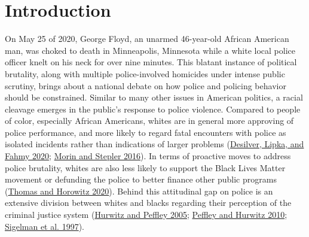 \documentclass[
  12pt,
]{article}
\begin{document}

\ifdefined\Shaded\renewenvironment{Shaded}{\begin{tcolorbox}[sharp corners, breakable, enhanced, interior hidden, boxrule=0pt, borderline west={3pt}{0pt}{shadecolor}, frame hidden]}{\end{tcolorbox}}\fi

\hypertarget{introduction}{%
\section{Introduction}\label{introduction}}

On May 25 of 2020, George Floyd, an unarmed 46-year-old African American
man, was choked to death in Minneapolis, Minnesota while a white local
police officer knelt on his neck for over nine minutes. This blatant
instance of political brutality, along with multiple police-involved
homicides under intense public scrutiny, brings about a national debate
on how police and policing behavior should be constrained. Similar to
many other issues in American politics, a racial cleavage emerges in the
public's response to police violence. Compared to people of color,
especially African Americans, whites are in general more approving of
police performance, and more likely to regard fatal encounters with
police as isolated incidents rather than indications of larger problems
(\protect\hyperlink{ref-desilver}{Desilver, Lipka, and Fahmy 2020};
\protect\hyperlink{ref-morin2016}{Morin and Stepler 2016}). In terms of
proactive moves to address police brutality, whites are also less likely
to support the Black Lives Matter movement or defunding the police to
better finance other public programs
(\protect\hyperlink{ref-thomas}{Thomas and Horowitz 2020}). Behind this
attitudinal gap on police is an extensive division between whites and
blacks regarding their perception of the criminal justice system
(\protect\hyperlink{ref-hurwitz2005}{Hurwitz and Peffley 2005};
\protect\hyperlink{ref-peffley2010}{Peffley and Hurwitz 2010};
\protect\hyperlink{ref-sigelman1997}{Sigelman et al. 1997}).
\end{document}
